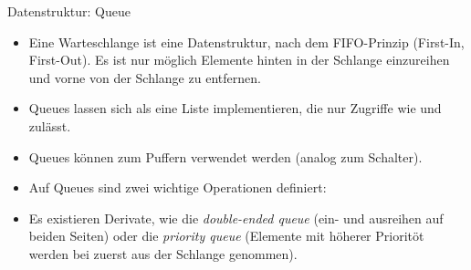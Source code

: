 \begin{frame}{Datenstruktur: Queue}
    \begin{itemize}[<+(1)->]
        \item Eine Warteschlange ist eine Datenstruktur, nach dem FIFO-Prinzip (First-In, First-Out).\pause{} Es ist nur möglich Elemente hinten in der Schlange einzureihen und vorne von der Schlange zu entfernen.
        \item Queues lassen sich als eine Liste implementieren,\pause{} die nur Zugriffe wie  und  zulässt.
        \item Queues können zum Puffern verwendet werden (analog zum Schalter).
        \item Auf Queues sind zwei wichtige Operationen definiert: 
        \item Es existieren Derivate, wie die \emph{double-ended queue} (ein- und ausreihen auf beiden Seiten) oder die \emph{priority queue} (Elemente mit höherer Prioritöt werden bei  zuerst aus der Schlange genommen).
    \end{itemize}
\end{frame}

